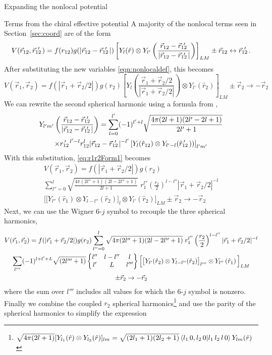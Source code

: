 \begin{section}{Expanding the nonlocal potential}
\begin{subsection}{Terms from the chiral effective potential}
A majority of the nonlocal terms seen in Section~\ref{sec:coord} are of the form
%
\begin{equation}
V(\rot,\rotp)=f(r_{12})g(|\rot-\rotp |) \left[Y_{l}(\hat{r})\otimes Y_{l'}\left(\frac{\rot-\rotp}{|\rot-\rotp |}\right)\right]_{L M}\pm \rot\leftrightarrow \rotp.
\end{equation}
%
After substituting the new variables \eqref{eqn:nonlocaldef}, this becomes
%
\begin{equation}\label{eq:r1r2Form1}
V(\vec{r}_1,\vec{r}_2)=f(|\vec{r}_1+\vec{r}_2/2|)g(r_2) \left[Y_{l}\left(\frac{\vec{r}_1+\vec{r}_2/2}{|\vec{r}_1+\vec{r}_2/2|}\right)\otimes Y_{l'}\left(\hat{r}_2\right)\right]_{L M} \pm \vec{r}_2\rightarrow -\vec{r}_2
\end{equation} 
%
We can rewrite the second spherical harmonic using a formula from \cite{varshalovich1988},
%
\begin{multline}
Y_{l'm'}\left(\frac{\rot-\rotp}{|\rot-\rotp |}\right) = \sum_{l=0}^{l'}(-1)^{l'+l}\sqrt{\frac{4\pi(2l+1)(2l'-2l+1)}{2l'+1}} \\
\times \rotpr^{l'-l} r_{12}^l |\rot-\rotp|^{-l'}\left[Y_{l}(\hat{r}_{12})\otimes Y_{l'-l}(\rotphat))\right]_{l'm'}
\end{multline}
With this substitution, \eqref{eq:r1r2Form1} becomes
\begin{multline}
V(\vec{r}_1,\vec{r}_2)=f(|\vec{r}_1+\vec{r}_2/2|)g(r_2) \\
\sum_{l''=0}^{l} \sqrt{\frac{4\pi(2l''+1)(2l-2l''+1)}{2l+1}} \;r_1^{l''} \left(\frac{r_2}{2}\right)^{l-l''}|\vec{r}_1+\vec{r}_2/2|^{-l} \\
 \Big[\big[Y_{l''}(\hat{r}_1) \otimes Y_{l-l''}(\hat{r}_2) \big]_l \otimes Y_{l'}\left(\hat{r}_2\right)\Big]_{L M} \pm \vec{r}_2 \rightarrow -\vec{r}_2
\end{multline}
Next, we can use the Wigner 6-$j$ symbol to recouple the three spherical harmonics, 
\begin{multline}
V(\vec{r}_1,\vec{r}_2)=f(|\vec{r}_1+\vec{r}_2/2|)g(r_2) 
\sum_{l''=0}^{l} \sqrt{4\pi(2l''+1)(2l-2l''+1)} \;r_1^{l''} \left(\frac{r_2}{2}\right)^{l-l''}|\vec{r}_1+\vec{r}_2/2|^{-l} \\
\sum_{l'''} (-1)^{l+l'+L} \sqrt{(2l'''+1)} \begin{Bmatrix} l'' & l-l'' & l \\ l' & L & l''' \end{Bmatrix} \Big[\big[Y_{l'}(\hat{r}_2) \otimes Y_{l-l''}(\hat{r}_2) \big]_{l'''} \otimes Y_{l''}\left(\hat{r}_1\right)\Big]_{L M} \\
\pm \vec{r}_2 \rightarrow -\vec{r}_2
\end{multline}
where the sum over $l'''$ includes all values for which the 6-$j$ symbol is nonzero. Finally we combine the coupled $r_2$ spherical harmonics\footnote{$\sqrt{4\pi(2l+1)}[Y_{l_1}(\hat{r})\otimes Y_{l_2}(\hat{r})]_{lm}=\sqrt{(2l_1+1)(2l_2+1)}\braket{l_1\,0,l_2\,0|l_1\,l_2\,l\,0}Y_{lm}(\hat{r})$} and use the parity of the spherical harmonics to simplify the expression 

\end{subsection}
\end{section}
